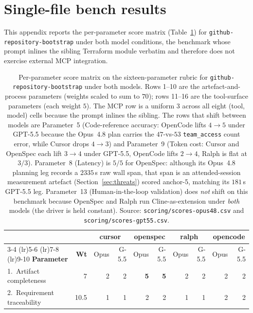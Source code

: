 \section{Single-file bench results}
\label{app:simple}

This appendix reports the per-parameter score matrix
(Table~\ref{tab:simple-matrix}) for
\texttt{github-repository-bootstrap} under both model conditions, the
benchmark whose prompt inlines the sibling Terraform module verbatim
and therefore does not exercise external MCP integration.

\begin{table}[h]
\centering
\caption{Per-parameter score matrix on the sixteen-parameter rubric
for \texttt{github-repository-bootstrap} under both models. Rows
1--10 are the artefact-and-process parameters
(weights scaled to sum to $70$); rows 11--16 are the tool-surface
parameters (each weight $5$). The MCP
row is a uniform $3$ across all eight (tool, model) cells because the
prompt inlines the sibling. The rows that shift between models are
Parameter~5 (Code-reference accuracy: OpenCode lifts $4{\to}5$ under
GPT-5.5 because the Opus~4.8 plan carries the $47$-vs-$53$
\texttt{team\_access} count error, while Cursor drops $4{\to}3$) and
Parameter~9 (Token cost: Cursor and OpenSpec each lift
$3{\to}4$ under GPT-5.5, OpenCode lifts $2{\to}4$, Ralph is flat at
$3/3$). Parameter~8 (Latency) is $5/5$ for OpenSpec: although its
Opus~4.8 planning leg records a $2335$\,s raw wall span, that span is
an attended-session measurement artefact (Section~\ref{sec:threats}) scored
anchor-5, matching its $181$\,s GPT-5.5 leg. Parameter~13 (Human-in-the-loop validation) does \emph{not}
shift on this benchmark because OpenSpec and Ralph run
Cline-as-extension under \emph{both} models (the driver is held
constant). Source: \texttt{scoring/scores-opus48.csv} and
\texttt{scoring/scores-gpt55.csv}.}
\label{tab:simple-matrix}
\footnotesize
\setlength{\tabcolsep}{3pt}
\begin{tabular}{lr rr rr rr rr}
\toprule
 & & \multicolumn{2}{c}{cursor} & \multicolumn{2}{c}{openspec} & \multicolumn{2}{c}{ralph} & \multicolumn{2}{c}{opencode} \\
 \cmidrule(lr){3-4} \cmidrule(lr){5-6} \cmidrule(lr){7-8} \cmidrule(lr){9-10}
\textbf{Parameter} & \textbf{Wt} & Opus & G-5.5 & Opus & G-5.5 & Opus & G-5.5 & Opus & G-5.5 \\
\midrule
1.\ Artifact completeness                & 7    & 2 & 2 & \textbf{5} & \textbf{5} & 2 & 2 & 2 & 2 \\
2.\ Requirement traceability             & 10.5 & 1 & 1 & 2          & 2          & 1 & 1 & 2 & 2 \\

\end{tabular}
\end{table}

